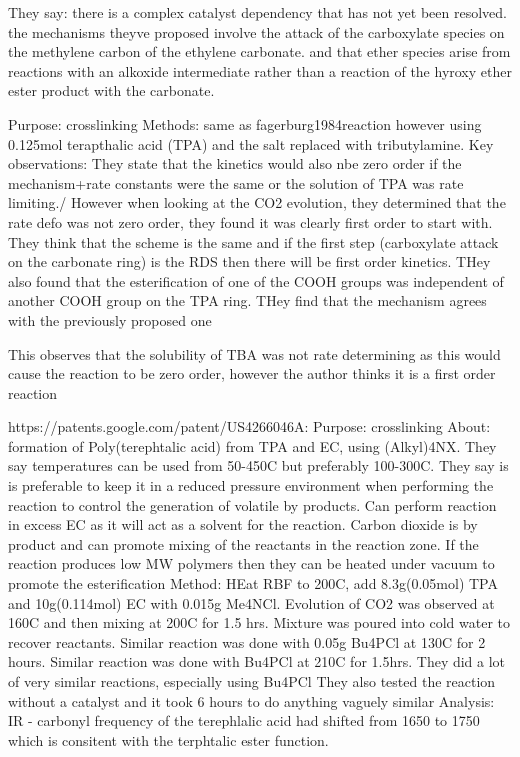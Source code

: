 They say: there is a complex catalyst dependency that has not yet been resolved. the mechanisms theyve proposed involve the attack of the carboxylate species on the methylene carbon of the ethylene carbonate. and that ether species arise from reactions with an alkoxide intermediate rather than a reaction of the hyroxy ether ester product with the carbonate.


\cite{fagerburg1985reaction}
Purpose: crosslinking
Methods: same as fagerburg1984reaction however using 0.125mol terapthalic acid (TPA) and the salt replaced with tributylamine.
Key observations: They state that the kinetics would also nbe zero order if the mechanism+rate constants were the same or the solution of TPA was rate limiting./ However when looking at the CO2 evolution, they determined that the rate defo was not zero order, they found it was clearly first order to start with. They think that the scheme is the same and if the first step (carboxylate attack on the carbonate ring)  is the RDS then there will be first order kinetics. THey also found that the esterification of one of the COOH groups was independent of another COOH group on the TPA ring. THey find that the mechanism agrees with the previously proposed one

This observes that the solubility of TBA was not rate determining as this would cause the reaction to be zero order, however the author thinks it is a first order reaction


https://patents.google.com/patent/US4266046A:
Purpose: crosslinking
About: formation of Poly(terephtalic acid) from TPA and EC, using (Alkyl)4NX. They say temperatures can be used from 50-450C but preferably 100-300C. They say is is preferable to keep it in a reduced pressure environment when performing the reaction to control the generation of volatile by products. Can perform reaction in excess EC as it will act as a solvent for the reaction. Carbon dioxide is by product and can promote mixing of the reactants in the reaction zone. If the reaction produces low MW polymers then they can be heated under vacuum to promote the esterification 
Method: HEat RBF to 200C, add 8.3g(0.05mol) TPA and 10g(0.114mol) EC with 0.015g Me4NCl. Evolution of CO2 was observed at 160C and then mixing at 200C for 1.5 hrs. Mixture was poured into cold water to recover reactants. Similar reaction was done with 0.05g Bu4PCl at 130C for 2 hours. Similar reaction was done with Bu4PCl at 210C for 1.5hrs. They did a lot of very similar reactions, especially using Bu4PCl
They also tested the reaction without a catalyst and it took 6 hours to do anything vaguely similar
Analysis: IR - carbonyl frequency of the terephlalic acid had shifted from 1650 to 1750 which is consitent with the terphtalic ester function.


